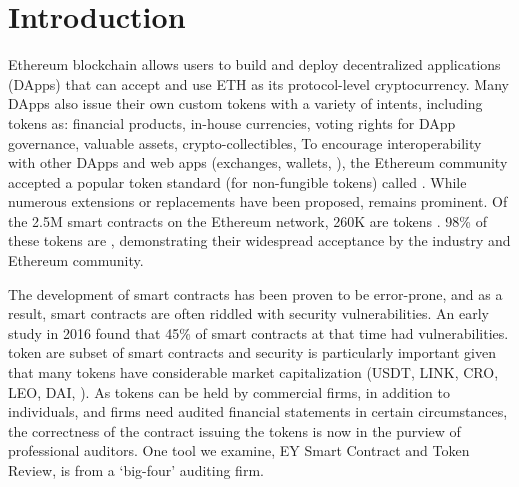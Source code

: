
\section{Introduction}
\label{sect:introduction}

Ethereum blockchain \cite{EthGit,EIP150} allows users to build and deploy decentralized applications (DApps) that can accept and use ETH as its protocol-level cryptocurrency. Many DApps also issue their own custom tokens with a variety of intents, including tokens as: financial products, in-house currencies, voting rights for DApp governance, valuable assets, crypto-collectibles, \etc To encourage interoperability with other DApps and web apps (exchanges, wallets, \etc), the Ethereum community accepted a popular token standard (for non-fungible tokens) called \erc\cite{ERC20Std}. While numerous \erc extensions or replacements have been proposed, \erc remains prominent. Of the 2.5M\cite{Alethio} smart contracts on the Ethereum network, 260K are tokens \cite{TokenTracker}. 98\% of these tokens are \erc\cite{EtherScan}, demonstrating their widespread acceptance by the industry and Ethereum community.

The development of smart contracts has been proven to be error-prone, and as a result, smart contracts are often riddled with security vulnerabilities. An early study in 2016 found that 45\% of smart contracts at that time had vulnerabilities\cite{MakSm}. \erc token are subset of smart contracts and security is particularly important given that many tokens have considerable market capitalization (\eg USDT, LINK, CRO, LEO, DAI, \etc). As tokens can be held by commercial firms, in addition to individuals, and firms need audited financial statements in certain circumstances, the correctness of the contract issuing the tokens is now in the purview of professional auditors. One tool we examine, EY Smart Contract and Token Review\cite{EYTool}, is from a `big-four' auditing firm. 


